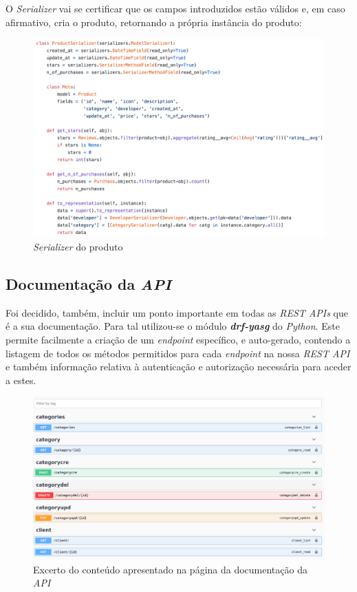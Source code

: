 \documentclass[10pt,english]{article}
\begin{document}
\par O \textit{Serializer} vai se certificar que os campos introduzidos estão válidos e, em caso afirmativo, cria o produto, retornando a própria instância do produto: 

\begin{figure}[!h]
        \centering
        \includegraphics[width=\textwidth]{images/serializer.png}
        \caption{\textit{Serializer} do produto}
\end{figure}


\subsection{Documentação da \textit{API}}
\par Foi decidido, também, incluir um ponto importante em todas as \textit{REST APIs} que é a sua documentação. Para tal utilizou-se o módulo \textit{\textbf{drf-yasg}} do \textit{Python}. Este permite facilmente a criação de um \textit{endpoint} específico, e auto-gerado, contendo a listagem de  todos os métodos permitidos para cada \textit{endpoint} na nossa \textit{REST API} e também informação relativa à autenticação e autorização necessária para aceder a estes.

\begin{figure}[!h]
        \centering
        \includegraphics[width=\textwidth]{images/swagger.png}
        \caption{Excerto do conteúdo apresentado na página da documentação da \textit{API}}
\end{figure}
\end{document}
